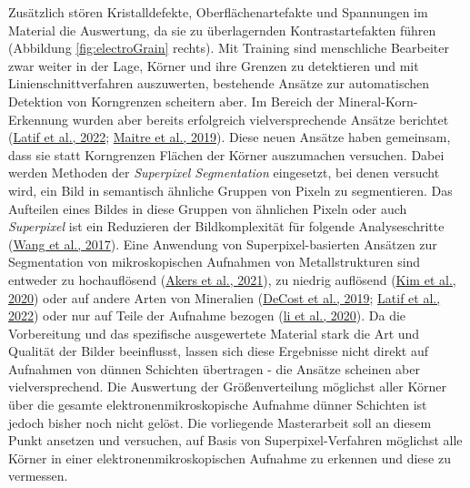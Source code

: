 \documentclass[
  12pt,
  openany]{book}
\begin{document}
Zusätzlich stören Kristalldefekte, Oberflächenartefakte und Spannungen im Material die Auswertung, da sie zu überlagernden Kontrastartefakten führen (Abbildung \ref{fig:electroGrain} rechts).
Mit Training sind menschliche Bearbeiter zwar weiter in der Lage, Körner und ihre Grenzen zu detektieren und mit Linienschnittverfahren auszuwerten, bestehende Ansätze zur automatischen Detektion von Korngrenzen scheitern aber.\newline
Im Bereich der Mineral-Korn-Erkennung wurden aber bereits erfolgreich vielversprechende Ansätze berichtet (\protect\hyperlink{ref-latifDeepLearningBasedAutomaticMineral2022}{Latif et al., 2022}; \protect\hyperlink{ref-maitreMineralGrainsRecognition2019}{Maitre et al., 2019}). Diese neuen Ansätze haben gemeinsam, dass sie statt Korngrenzen Flächen der Körner auszumachen versuchen. Dabei werden Methoden der \emph{Superpixel Segmentation} eingesetzt, bei denen versucht wird, ein Bild in semantisch ähnliche Gruppen von Pixeln zu segmentieren. Das Aufteilen eines Bildes in diese Gruppen von ähnlichen Pixeln oder auch \emph{Superpixel} ist ein Reduzieren der Bildkomplexität für folgende Analyseschritte (\protect\hyperlink{ref-wangSuperpixelSegmentationBenchmark2017}{Wang et al., 2017}). Eine Anwendung von Superpixel-basierten Ansätzen zur Segmentation von mikroskopischen Aufnahmen von Metallstrukturen sind entweder zu hochauflösend (\protect\hyperlink{ref-akersRapidFlexibleSegmentation2021}{Akers et al., 2021}), zu niedrig auflösend (\protect\hyperlink{ref-kimUnsupervisedMicrostructureSegmentation2020}{Kim et al., 2020}) oder auf andere Arten von Mineralien (\protect\hyperlink{ref-decostHighThroughputQuantitative2019}{DeCost et al., 2019}; \protect\hyperlink{ref-latifDeepLearningBasedAutomaticMineral2022}{Latif et al., 2022}) oder nur auf Teile der Aufnahme bezogen (\protect\hyperlink{ref-liMetallographicImageSegmentation2020}{li et al., 2020}).\newline
Da die Vorbereitung und das spezifische ausgewertete Material stark die Art und Qualität der Bilder beeinflusst, lassen sich diese Ergebnisse nicht direkt auf Aufnahmen von dünnen Schichten übertragen - die Ansätze scheinen aber vielversprechend. Die Auswertung der Größenverteilung möglichst aller Körner über die gesamte elektronenmikroskopische Aufnahme dünner Schichten ist jedoch bisher noch nicht gelöst.\newline
Die vorliegende Masterarbeit soll an diesem Punkt ansetzen und versuchen, auf Basis von Superpixel-Verfahren möglichst alle Körner in einer elektronenmikroskopischen Aufnahme zu erkennen und diese zu vermessen.
\end{document}
